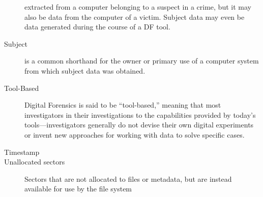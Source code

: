 \begin{description}
  extracted from a computer belonging to a suspect in a crime, but it
  may also be data from the computer of a victim. Subject data may
  even be data generated during the course of a DF tool.
\item[Subject] is a common shorthand for the owner or primary use of a computer
  system from which subject data was obtained. 
\item[Tool-Based] Digital Forensics is said to be ``tool-based,''
  meaning that most investigators in their investigations to the
  capabilities provided by today's tools---investigators generally do
  not devise their own digital experiments or invent new approaches
  for working with data to solve specific cases.
\item[Timestamp]
\item[Unallocated sectors] Sectors that are not allocated to files or
  metadata, but are instead available for use by the file system
\end{description}
